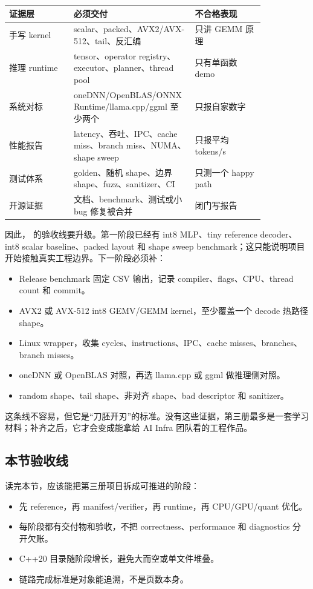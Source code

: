\begin{center}
\begin{tabular}{p{0.24\linewidth}p{0.34\linewidth}p{0.26\linewidth}}
\toprule
证据层 & 必须交付 & 不合格表现 \\
\midrule
手写 kernel & scalar、packed、AVX2/AVX-512、tail、反汇编 & 只讲 GEMM 原理 \\
推理 runtime & tensor、operator registry、executor、planner、thread pool & 只有单函数 demo \\
系统对标 & oneDNN/OpenBLAS/ONNX Runtime/llama.cpp/ggml 至少两个 & 只报自家数字 \\
性能报告 & latency、吞吐、IPC、cache miss、branch miss、NUMA、shape sweep & 只报平均 tokens/s \\
测试体系 & golden、随机 shape、边界 shape、fuzz、sanitizer、CI & 只测一个 happy path \\
开源证据 & 文档、benchmark、测试或小 bug 修复被合并 & 闭门写报告 \\
\bottomrule
\end{tabular}
\end{center}

因此， 的验收线要升级。第一阶段已经有 int8 MLP、tiny reference decoder、int8 scalar baseline、packed layout 和 shape sweep benchmark；这只能说明项目开始接触真实工程边界。下一阶段必须补：

\begin{itemize}
  \item Release benchmark 固定 CSV 输出，记录 compiler、flags、CPU、thread count 和 commit。
  \item AVX2 或 AVX-512 int8 GEMV/GEMM kernel，至少覆盖一个 decode 热路径 shape。
  \item Linux  wrapper，收集 cycles、instructions、IPC、cache misses、branches、branch misses。
  \item oneDNN 或 OpenBLAS 对照，再选 llama.cpp 或 ggml 做推理侧对照。
  \item random shape、tail shape、非对齐 shape、bad descriptor 和 sanitizer。
\end{itemize}

这条线不容易，但它是“刀胚开刃”的标准。没有这些证据，第三册最多是一套学习材料；补齐之后，它才会变成能拿给 AI Infra 团队看的工程作品。

\subsection{本节验收线}

读完本节，应该能把第三册项目拆成可推进的阶段：

\begin{itemize}
  \item 先 reference，再 manifest/verifier，再 runtime，再 CPU/GPU/quant 优化。
  \item 每阶段都有交付物和验收，不把 correctness、performance 和 diagnostics 分开欠账。
  \item C++20 目录随阶段增长，避免大而空或单文件堆叠。
  \item 链路完成标准是对象能追溯，不是页数本身。
\end{itemize}
